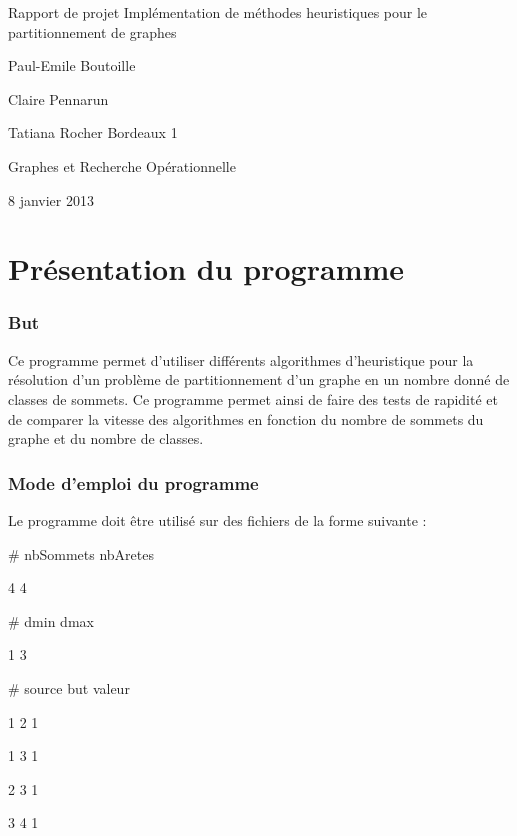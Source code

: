 \documentclass[12pt]{article}
\begin{document}
\begin{titlepage}
\begin{center}

\hfill
\vfill
\bigskip
\huge{Rapport de projet} 
\vfill
\bigskip 
\Huge 
\bigskip Implémentation de méthodes heuristiques pour le partitionnement de graphes \par 
\vfill
\Large Paul-Emile Boutoille \par
		Claire Pennarun \par 
		Tatiana Rocher
\vfill
\Large Bordeaux 1 \par \Large Graphes et Recherche Opérationnelle		
		\bigskip 
\bigskip

\Large
8 janvier 2013
\end{center}
\end{titlepage}

\tableofcontents
\newpage


\part{Présentation du programme}
\section{But}

Ce programme permet d’utiliser différents algorithmes d’heuristique pour la résolution d’un problème de partitionnement d’un graphe en un nombre donné de classes de sommets. Ce programme permet ainsi de faire des tests de rapidité et de comparer la vitesse des algorithmes en fonction du nombre de sommets du graphe et du nombre de classes.

\section{Mode d'emploi du programme}

Le programme doit être utilisé sur des fichiers de la forme suivante :

\# nbSommets nbAretes

4 4

\# dmin dmax

1 3

\# source but valeur

1 2 1

1 3 1

2 3 1

3 4 1
\end{document}
